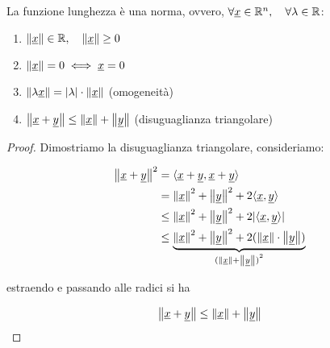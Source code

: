 La funzione lunghezza è una norma, ovvero, \(\forall \ux \in \Rn , \quad \forall \lambda \in \R \):

\begin{enumerate}
    \item \(\norm\ux \in \R, \quad \norm\ux \geq 0\)
    \item \(\norm\ux = 0 \iff \ux = 0\)
    \item \(\norm{\lambda \ux} = |\lambda| \cdot \norm\ux \) \hfill (omogeneità)
    \item \(\norm{\ux+\uy} \leq \norm\ux + \norm\uy \) \hfill (disuguaglianza triangolare)
\end{enumerate}


\begin{proof}
    Dimostriamo la disuguaglianza triangolare, consideriamo:

    \begin{align*}
        \norm{\ux+\uy}^{2} & = \prods{\ux+\uy}{\ux+\uy}                                                                             \\
                           & = \norm\ux^{2}+\norm\uy^{2} + 2 \prods{\ux}{\uy}                                                       \\
                           & \le \norm\ux^{2} + \norm\uy ^{2} + 2|\prods{\ux}{\uy}|                                                 \\
                           & \le \underbrace{\norm\ux ^{2} + \norm\uy^{2} + 2(\norm\ux \cdot \norm\uy)}_{{(\norm\ux+\norm\uy)}^{2}}
    \end{align*}

    estraendo e passando alle radici si ha

    \[
        \norm{\ux+\uy} \le \norm\ux+\norm\uy
    \]
\end{proof}

